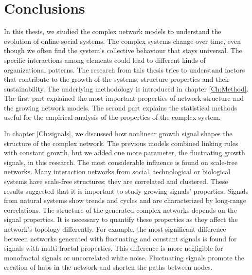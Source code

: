 \chapter{Conclusions} %
\label{Ch:Conclussion}

In this thesis, we studied the complex network models to understand the evolution of online social systems. %
The complex systems change over time, even though we often find the system's collective behaviour that stays universal. The specific interactions among elements could lead to different kinds of organizational patterns. The research from this thesis tries to understand factors that contribute to the growth of the systems, structure properties and their sustainability. The underlying methodology is introduced in chapter \ref{Ch:Method}. The first part explained the most important properties of network structure and the growing network models. The second part explains the statistical methods useful for the empirical analysis of the properties of the complex system.  

In chapter \ref{Ch:signals}, we discussed how nonlinear growth signal shapes the structure of the complex network. The previous models combined linking rules with constant growth, but we added one more parameter, the fluctuating growth signals, in this research. The most considerable influence is found on scale-free networks. Many interaction networks from social, technological or biological systems have scale-free structures; they are correlated and clustered. These results suggested that it is important to study growing signals' properties. Signals from natural systems show trends and cycles and are characterized by long-range correlations. The structure of the generated complex networks depends on the signal properties. It is necessary to quantify these properties as they affect the network's topology differently. For example, the most significant difference between networks generated with fluctuating and constant signals is found for signals with multi-fractal properties. This difference is more negligible for monofractal signals or uncorrelated white noise. Fluctuating signals promote the creation of hubs in the network and shorten the paths between nodes.

